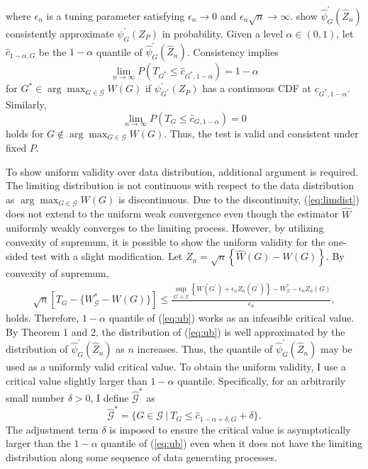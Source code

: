 \documentclass[12pt,oneside,reqno,english]{amsart}
\theoremstyle{definition}
\begin{document}
where $\epsilon_{n}$ is a tuning parameter satisfying $\epsilon_{n}\rightarrow 0$ and $\epsilon_{n}\sqrt{n}\rightarrow \infty$. 
\cite{HL:18} show $\hat{\psi}^{\prime}_{G}(\hat{Z}_{n})$ consistently approximate $\psi^{\prime}_{G}(Z_{P})$ in probability. 
Given a level $\alpha\in (0,1)$, let $\hat{c}_{1-\alpha,G}$ be the $1-\alpha$ quantile of
$\hat{\psi}^{\prime}_{G}(\hat{Z}_{n})$. 
Consistency implies 
\[\lim_{n\rightarrow \infty} P(T_{G^{*}}\leq \hat{c}_{G^{*},1-\alpha})=1-\alpha\]
for $G^{*}\in \arg\max_{G\in \mathcal{G}}W(G)$ if $\psi^{\prime}_{G^{*}}(Z_{P})$ has a continuous CDF at $c_{G^{*},1-\alpha}$. 
Similarly, 
\[\lim_{n\rightarrow \infty} P(T_{G}\leq \hat{c}_{G,1-\alpha})=0\]
holds for $G\not\in \arg\max_{G\in \mathcal{G}}W(G)$. Thus, the test is valid and consistent under fixed $P$. 

To show uniform validity over data distribution, additional argument is required.   
The limiting distribution is not continuous with respect to the data distribution as $\arg\max_{G\in \mathcal{G}}W(G)$ is discontinuous. 
Due to the discontinuity, (\ref{eq:limdist}) does not extend to the uniform weak convergence even though the estimator $\hat{W}$ uniformly weakly converges to the limiting process. However, by utilizing convexity of supremum, it is possible to show the uniform validity for the one-sided test with a slight modification. 
Let $Z_{n}=\sqrt{n}\left\{\hat{W}(G)-W(G)\right\}$. By convexity of supremum, 
\begin{align}
\sqrt{n}\left[T_{G}-\{W^{*}_{\mathcal{G}}-W(G)\}\right]\leq \frac{\sup_{G^{\prime}\in \mathcal{G}}\left\{W(G^{\prime})+\epsilon_{n}Z_{n}(G^{\prime})\right\}-W^{*}_{\mathcal{G}}-\epsilon_{n}Z_{n}(G)}{\epsilon_{n}},\label{eq:ub}
\end{align}
holds. Therefore, $1-\alpha$ quantile of (\ref{eq:ub}) works as an infeasible critical value. 
By Theorem 1 and 2, the distribution of (\ref{eq:ub}) is well approximated by 
the distribution of $\hat{\psi}^{\prime}_{G}(\hat{Z}_{n})$ as $n$ increases.  
Thus, the quantile of $\hat{\psi}^{\prime}_{G}(\hat{Z}_{n})$ may be used as a uniformly valid critical value.
To obtain the uniform validity, I use a critical value slightly larger than $1-\alpha$ quantile. 
Specifically, for an arbitrarily small number $\delta>0$, I define $\hat{\mathcal{G}}^{*}$ as 
\[\hat{\mathcal{G}}^{*}=\{G\in \mathcal{G}\ | \ T_{G}\leq \hat{c}_{1-\alpha+\delta,G}+\delta\}.\]
The adjustment term $\delta$ is imposed to ensure the critical value is asymptotically larger than the $1-\alpha$ quantile of 
(\ref{eq:ub}) even when it does not have the limiting distribution along some sequence of data generating processes. 
\end{document}
